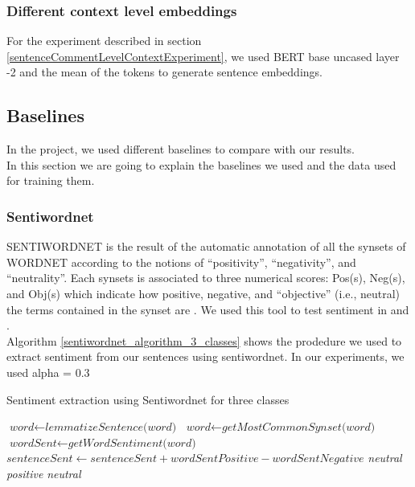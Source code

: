 \subsubsection{Different context level embeddings}
 \label{contexLeveLEmbeddings}
For the experiment described in section \ref{sentenceCommentLevelContextExperiment}, we used BERT base uncased layer -2 and the mean of the tokens to generate sentence embeddings.
\subsection{Baselines}
In the project, we used different baselines to compare with our results.\\
In this section we are going to explain the baselines we used and the data used for training them.
\subsubsection{Sentiwordnet}
SENTIWORDNET is the result of the automatic annotation of all the synsets of WORDNET according to the notions of “positivity”, “negativity”, and “neutrality”. Each synsets is  associated  to  three numerical  scores: Pos(s), Neg(s), and Obj(s) which  indicate  how  positive, negative, and “objective” (i.e., neutral) the terms contained in the synset are \cite{sentiWordnet}. We used this tool to test sentiment in {\dataEN} and {\dataORG}.\\
Algorithm \ref{sentiwordnet_algorithm_3_classes} shows the prodedure we used to extract sentiment from our sentences using sentiwordnet. In our experiments, we used alpha = 0.3\\
\begin{algorithm}[h]
\caption{Sentiment extraction using Sentiwordnet for three classes}\label{euclid}
\label{sentiwordnet_algorithm_3_classes}
\begin{algorithmic}[1]
\State $\textit{word} \gets \textit{lemmatizeSentence(word)}$
\State $\textit{word} \gets \textit{getMostCommonSynset(word)}$
\State $\textit{wordSent} \gets \textit{getWordSentiment(word)}$
\State $\textit{sentenceSent} \gets \textit{sentenceSent} + \textit{wordSentPositive} - \textit{wordSentNegative}$
\EndFor
{}
    \Return \textit{neutral}
    \Return \textit{positive}
\Else
    \Return \textit{neutral}
\EndIf
\EndProcedure
\end{algorithmic}
\end{algorithm}
